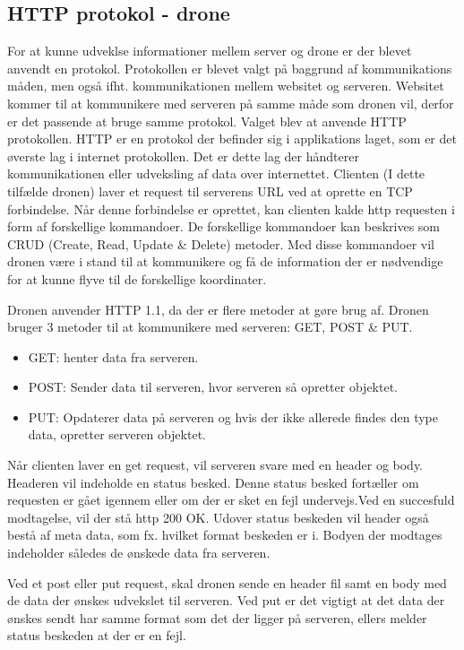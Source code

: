 \subsection{HTTP protokol - drone}

For at kunne udveklse informationer mellem server og drone er der blevet anvendt en protokol. Protokollen er blevet valgt på baggrund af kommunikations måden, men også ifht. kommunikationen mellem websitet og serveren. Websitet kommer til at kommunikere med serveren på samme måde som dronen vil, derfor er det passende at bruge samme protokol. 
Valget blev at anvende HTTP protokollen. HTTP er en protokol der befinder sig i applikations laget, som er det øverste lag i internet protokollen. Det er dette lag der håndterer kommunikationen eller udveksling af data over internettet. 
Clienten (I dette tilfælde dronen) laver et request til serverens URL ved at oprette en TCP forbindelse. Når denne forbindelse er oprettet, kan clienten kalde http requesten i form af forskellige kommandoer. De forskellige kommandoer kan beskrives som CRUD (Create, Read, Update \& Delete) metoder. 
Med disse kommandoer vil dronen være i stand til at kommunikere og få de information der er nødvendige for at kunne flyve til de forskellige koordinater.

Dronen anvender HTTP 1.1, da der er flere metoder at gøre brug af. 
Dronen bruger 3 metoder til at kommunikere med serveren: GET, POST \& PUT. 
\begin{itemize}
	\item GET: henter data fra serveren.
	\item POST: Sender data til serveren, hvor serveren så opretter objektet.
	\item PUT: Opdaterer data på serveren og hvis der ikke allerede findes den type data, opretter serveren objektet.
\end{itemize}

Når clienten laver en get request, vil serveren svare med en header og body. Headeren vil indeholde en status besked. Denne status besked fortæller om requesten er gået igennem eller om der er sket en fejl undervejs.Ved en succesfuld modtagelse, vil der stå http 200 OK. Udover status beskeden vil header også bestå af meta data, som fx. hvilket format beskeden er i. 
Bodyen der modtages indeholder således de ønskede data fra serveren.

Ved et post eller put request, skal dronen sende en header fil samt en body med de data der ønskes udvekslet til serveren. 
Ved put er det vigtigt at det data der ønskes sendt har samme format som det der ligger på serveren, ellers melder status beskeden at der er en fejl. 




